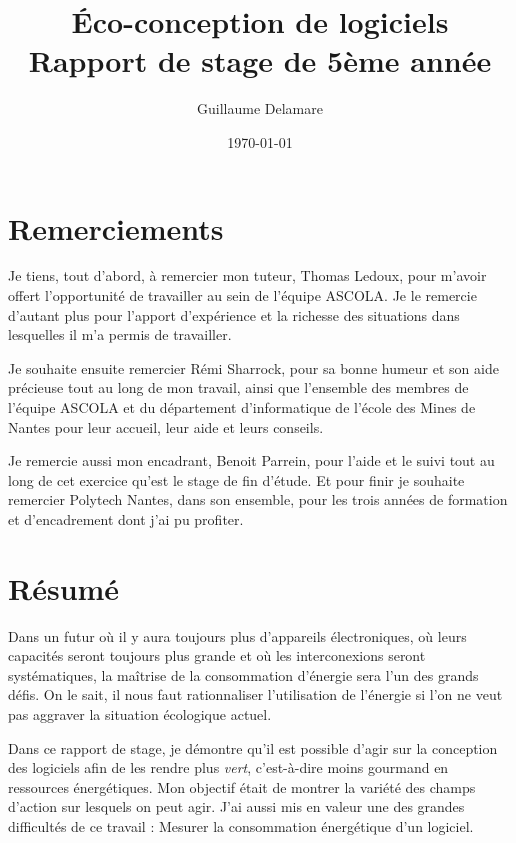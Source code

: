 \documentclass[a4paper, 11pt]{report}
\title{Éco-conception de logiciels\\ \large Rapport de stage de 5ème année}
\author{Guillaume Delamare}
\date{\today}
\begin{document}
\renewcommand{\labelitemi}{$\bullet$}
\renewcommand{\labelitemii}{$\diamond$}
\renewcommand{\labelitemiii}{$\ast$}
\renewcommand{\labelitemiv}{$\cdot$}

\maketitle

\section*{Remerciements}
Je tiens, tout d'abord, à remercier mon tuteur, Thomas Ledoux, pour m'avoir offert l'opportunité de travailler au sein de l'équipe ASCOLA. Je le remercie d'autant plus pour l'apport d'expérience et la richesse des situations dans lesquelles il m'a permis de travailler.

Je souhaite ensuite remercier Rémi Sharrock, pour sa bonne humeur et son aide précieuse tout au long de mon travail, ainsi que l'ensemble des membres de l'équipe ASCOLA et du département d'informatique de l'école des Mines de Nantes pour leur accueil, leur aide et leurs conseils.

Je remercie aussi mon encadrant, Benoit Parrein, pour l'aide et le suivi tout au long de cet exercice qu'est le stage de fin d'étude. Et pour finir je souhaite remercier Polytech Nantes, dans son ensemble, pour les trois années de formation et d'encadrement dont j'ai pu profiter.

\newpage

\section*{Résumé}
Dans un futur où il y aura toujours plus d'appareils électroniques, où leurs capacités seront toujours plus grande et où les interconexions seront systématiques, la maîtrise de la consommation d'énergie sera l'un des grands défis. On le sait, il nous faut rationnaliser l'utilisation de l'énergie si l'on ne veut pas aggraver la situation écologique actuel.

Dans ce rapport de stage, je démontre qu'il est possible d'agir sur la conception des logiciels afin de les rendre plus \textit{vert}, c'est-à-dire moins gourmand en ressources énergétiques. Mon objectif était de montrer la variété des champs d'action sur lesquels on peut agir. J'ai aussi mis en valeur une des grandes difficultés de ce travail : Mesurer la consommation énergétique d'un logiciel.
\end{document}

